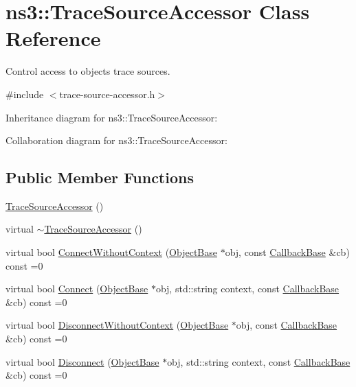 \hypertarget{classns3_1_1TraceSourceAccessor}{}\section{ns3\+:\+:Trace\+Source\+Accessor Class Reference}
\label{classns3_1_1TraceSourceAccessor}


Control access to objects\textquotesingle{} trace sources.  




{\ttfamily \#include $<$trace-\/source-\/accessor.\+h$>$}



Inheritance diagram for ns3\+:\+:Trace\+Source\+Accessor\+:


Collaboration diagram for ns3\+:\+:Trace\+Source\+Accessor\+:
\subsection*{Public Member Functions}
\begin{DoxyCompactItemize}
\item 
\hyperlink{classns3_1_1TraceSourceAccessor_a39aca5910c30dadcc01295a7de238e2a}{Trace\+Source\+Accessor} ()
\item 
virtual \hyperlink{classns3_1_1TraceSourceAccessor_aef40bc42427694a83be7ba230e274648}{$\sim$\+Trace\+Source\+Accessor} ()
\item 
virtual bool \hyperlink{classns3_1_1TraceSourceAccessor_a1baf1c36b3d644fe210cc0e0835cfeb9}{Connect\+Without\+Context} (\hyperlink{classns3_1_1ObjectBase}{Object\+Base} $\ast$obj, const \hyperlink{classns3_1_1CallbackBase}{Callback\+Base} \&cb) const =0
\item 
virtual bool \hyperlink{classns3_1_1TraceSourceAccessor_a2edac9639d21e12e9aee53c508bef172}{Connect} (\hyperlink{classns3_1_1ObjectBase}{Object\+Base} $\ast$obj, std\+::string context, const \hyperlink{classns3_1_1CallbackBase}{Callback\+Base} \&cb) const =0
\item 
virtual bool \hyperlink{classns3_1_1TraceSourceAccessor_a76a36d41611ea647e26884d9bf403544}{Disconnect\+Without\+Context} (\hyperlink{classns3_1_1ObjectBase}{Object\+Base} $\ast$obj, const \hyperlink{classns3_1_1CallbackBase}{Callback\+Base} \&cb) const =0
\item 
virtual bool \hyperlink{classns3_1_1TraceSourceAccessor_a366f52ad46fc0c1058e21e24932ab546}{Disconnect} (\hyperlink{classns3_1_1ObjectBase}{Object\+Base} $\ast$obj, std\+::string context, const \hyperlink{classns3_1_1CallbackBase}{Callback\+Base} \&cb) const =0
\end{DoxyCompactItemize}
